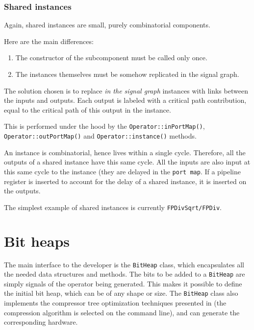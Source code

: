 \documentclass{article}
\begin{document}
\subsubsection{Shared instances}

Again, shared instances are small, purely combinatorial components.

Here are the main differences:
\begin{enumerate}
\item The constructor of the subcomponent must be called only once.
\item The instances themselves must be somehow replicated in the signal graph.
\end{enumerate}
The solution chosen is to replace \emph{in the signal graph} instances with links between the inputs and outputs.
Each output is labeled with a critical path contribution,   equal to the critical path of this output in the instance.

This is performed under the hood by the \verb!Operator::inPortMap()!, \verb!Operator::outPortMap()! and \verb!Operator::instance()! methods.

An instance is combinatorial, hence lives within a single cycle.
Therefore, all the outputs of a shared instance have this same cycle.
All the inputs are also input at this same cycle to the instance (they are delayed in the \texttt{port map}.
If a pipeline register is inserted to account for the delay of a shared instance, it is inserted on the outputs.

The simplest example of shared instances is currently \texttt{FPDivSqrt/FPDiv}.




\section{Bit heaps \label{sec:bitheap}}

The main interface to the developer is the  \texttt{BitHeap} class, which encapsulates all the needed data structures and methods. 
The bits to be added to a \texttt{BitHeap} are simply  signals of the operator being generated.
This makes it possible to define the initial bit heap, which can be of any shape or size. 
The \texttt{BitHeap} class also implements the compressor tree optimization techniques presented in \cite{DinIstSer2013-FPL-BitHeap,kz14a,kz14b,kk18} (the compression algorithm is selected on the command line), and can generate the corresponding hardware.


\end{document}
